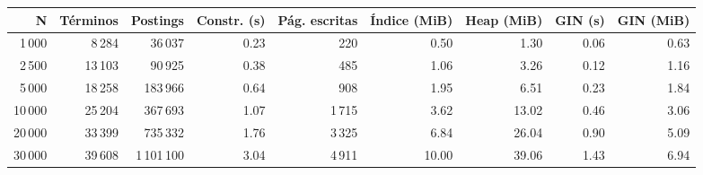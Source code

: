 \begin{tabular}{rrrrrrrrr}
\hline
N & Términos & Postings & Constr. (s) & Pág. escritas & Índice (MiB) & Heap (MiB) & GIN (s) & GIN (MiB) \\
\hline
1\,000 & 8\,284 & 36\,037 & 0.23 & 220 & 0.50 & 1.30 & 0.06 & 0.63 \\
2\,500 & 13\,103 & 90\,925 & 0.38 & 485 & 1.06 & 3.26 & 0.12 & 1.16 \\
5\,000 & 18\,258 & 183\,966 & 0.64 & 908 & 1.95 & 6.51 & 0.23 & 1.84 \\
10\,000 & 25\,204 & 367\,693 & 1.07 & 1\,715 & 3.62 & 13.02 & 0.46 & 3.06 \\
20\,000 & 33\,399 & 735\,332 & 1.76 & 3\,325 & 6.84 & 26.04 & 0.90 & 5.09 \\
30\,000 & 39\,608 & 1\,101\,100 & 3.04 & 4\,911 & 10.00 & 39.06 & 1.43 & 6.94 \\
\hline
\end{tabular}

